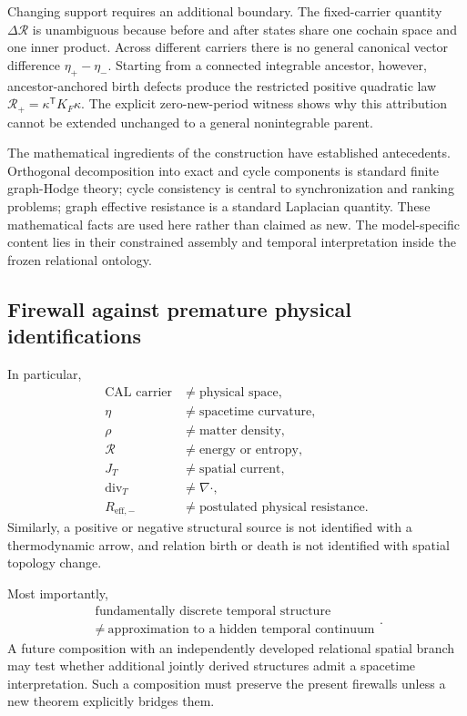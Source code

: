 \documentclass[aip,jmp,amsmath,amssymb,reprint]{revtex4-2}
\newcommand{\Rcal}{\mathcal{R}}
\newcommand{\divT}{\operatorname{div}_{T}}
\begin{document}
Changing support requires an additional boundary. The fixed-carrier quantity $\Delta\Rcal$ is unambiguous because before and after states share one cochain space and one inner product. Across different carriers there is no general canonical vector difference $\eta_+-\eta_-$. Starting from a connected integrable ancestor, however, ancestor-anchored birth defects produce the restricted positive quadratic law $\Rcal_+=\kappa^{\mathsf T}K_F\kappa$. The explicit zero-new-period witness shows why this attribution cannot be extended unchanged to a general nonintegrable parent.

The mathematical ingredients of the construction have established antecedents. Orthogonal decomposition into exact and cycle components is standard finite graph-Hodge theory; cycle consistency is central to synchronization and ranking problems; graph effective resistance is a standard Laplacian quantity. These mathematical facts are used here rather than claimed as new. The model-specific content lies in their constrained assembly and temporal interpretation inside the frozen relational ontology.

\subsection{Firewall against premature physical identifications}

In particular,
\begin{align}
\text{CAL carrier}&\neq\text{physical space},\\
\eta&\neq\text{spacetime curvature},\\
\rho&\neq\text{matter density},\\
\Rcal&\neq\text{energy or entropy},\\
J_T&\neq\text{spatial current},\\
\divT&\neq\nabla\!\cdot,\\
R_{\mathrm{eff},-}&\neq\text{postulated physical resistance}.
\end{align}
Similarly, a positive or negative structural source is not identified with a thermodynamic arrow, and relation birth or death is not identified with spatial topology change.

Most importantly,
\begin{equation}
\boxed{
\begin{gathered}
\text{fundamentally discrete temporal structure}\\
\neq\ \text{approximation to a hidden temporal continuum}
\end{gathered}
}.
\label{eq:no-continuum-target}
\end{equation}
A future composition with an independently developed relational spatial branch may test whether additional jointly derived structures admit a spacetime interpretation. Such a composition must preserve the present firewalls unless a new theorem explicitly bridges them.
\end{document}
